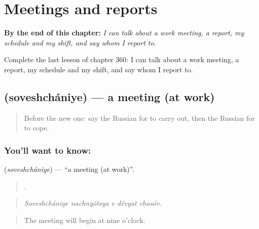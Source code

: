 
\chapter{Meetings and reports}
\label{ch:ru-meetings-and-reports}

\begin{chapteropening}
\textbf{By the end of this chapter:} \emph{I can talk about a work meeting, a report, my schedule and my shift, and say whom I report to.}

Complete the last lesson of chapter 360: I can talk about a work meeting, a report, my schedule and my shift, and say whom I report to.
\end{chapteropening}

\section[\texorpdfstring{\ru{совещание} (soveshchániye)}{совещание (soveshchániye)}]{ (soveshchániye) — a meeting (at work)}

\label{lesson:RU-C360-soveshchanie}



\begin{quote}
Before the new one: say the Russian for to carry out, then the Russian for to cope.
\end{quote}

\subsection*{You'll want to know: }
\textbf{} (\emph{soveshchániye}) — \textquotedblleft{}a meeting (at work)\textquotedblright{}.

\begin{quote}
    .
\end{quote}

\begin{quote}
\emph{Soveshchániye nachnyótsya v dévyat chasóv.}
\end{quote}

\begin{quote}
The meeting will begin at nine o’clock.
\end{quote}

